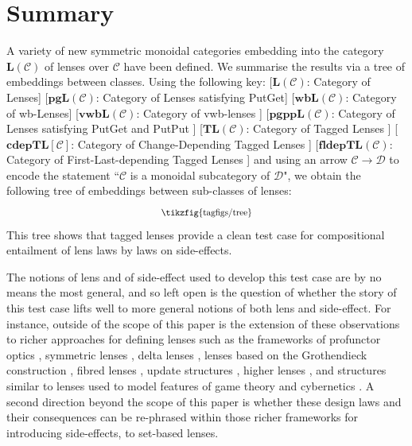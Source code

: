 \documentclass[a4paper,11pt]{article}
\newcommand{\tikzfigscale}[2]{\scalebox{#1}{\tikzfig{#2}}}
\newcommand{\cat}{\mathbf}
\theoremstyle{definition}
\theoremstyle{plain}
\theoremstyle{plain}
\theoremstyle{definition}
\begin{document}
\section{Summary}
A variety of new symmetric monoidal categories embedding into the category $\cat{L}(\mathcal{C})$ of lenses over $\mathcal{C}$ have been defined. We summarise the results via a tree of embeddings between classes. Using the following key: [$\cat{L}(\mathcal{C})$: Category of Lenses] [$\cat{pgL}(\mathcal{C})$: Category of Lenses satisfying PutGet] [$\cat{wbL}(\mathcal{C})$: Category of wb-Lenses] [$\cat{vwbL}(\mathcal{C})$: Category of vwb-lenses
   ] [$\cat{pgppL}(\mathcal{C})$: Category of Lenses satisfying PutGet and PutPut
   ] [$\cat{TL}(\mathcal{C})$: Category of Tagged Lenses
   ] [$\mathbf{cdepTL}[\mathcal{C}]$: Category of Change-Depending Tagged Lenses
   ] [$\cat{fldepTL}(\mathcal{C})$: Category of First-Last-depending Tagged Lenses ]
and using an arrow $\mathcal{C} \rightarrow \mathcal{D}$ to encode the statement ``$\mathcal{C}$ is a monoidal subcategory of $\mathcal{D}$", we obtain the following tree of embeddings between sub-classes of lenses:
\[\tikzfigscale{0.8}{tagfigs/tree}\]
This tree shows that tagged lenses provide a clean test case for compositional entailment of lens laws by laws on side-effects. 

The notions of lens and of side-effect used to develop this test case are by no means the most general, and so left open is the question of whether the story of this test case lifts well to more general notions of both lens and side-effect.
For instance, outside of the scope of this paper is the extension of these observations to richer approaches for defining lenses such as the frameworks of profunctor optics \cite{Riley2018CategoriesOO, clarke2020profunctor, lens_dynamics_doubles2021}, symmetric lenses \cite{clarke_diagrammatic} , delta lenses \cite{clarke2020profunctor}, lenses based on the Grothendieck construction \cite{spivak2020generalized}, fibred lenses \cite{braithwaite2021fibre}, update structures \cite{hefford2020categories, safari}, higher lenses \cite{higher_lenses}, and structures similar to lenses used to model features of game theory \cite{hedges_games, lens_comp_game, dilavore2020games, capucci2021translating} and cybernetics \cite{cyber_kittens}. A second direction beyond the  scope of this paper is whether these design laws and their consequences can be re-phrased within those richer frameworks for introducing side-effects, \cite{abou_monads, monadic_combinator, monads_entangled_notions, monadic_composing} to set-based lenses. 
\end{document}
